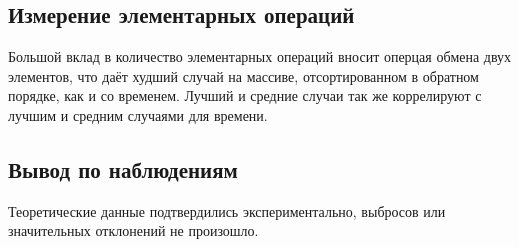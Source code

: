 \documentclass[11pt]{article}
\begin{document}
\subsection{Измерение элементарных операций}

\begin{center}
\end{center}
{ \hspace*{\fill} }

\begin{center}
\end{center}
{ \hspace*{\fill} }

Большой вклад в количество элементарных операций вносит оперцая обмена двух элементов, 
что даёт худший случай на массиве, отсортированном в обратном порядке, как и со временем. 
Лучший и средние случаи так же коррелируют с лучшим и средним случаями для времени.

\subsection{Вывод по наблюдениям}
Теоретические данные подтвердились экспериментально, выбросов или значительных отклонений не произошло.

\begin{center}
\end{center}
{ \hspace*{\fill} }

\begin{center}
\end{center}
{ \hspace*{\fill} }

\begin{center}
\end{center}
{ \hspace*{\fill} }

\begin{center}
\end{center}
{ \hspace*{\fill} }
\end{document}
